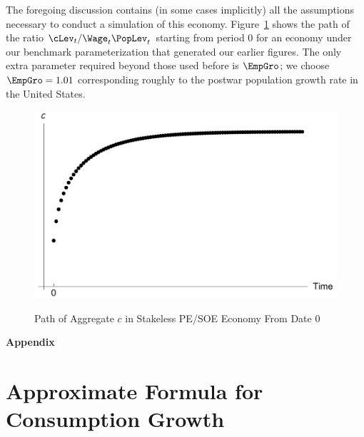 \documentclass{handout}
\begin{document}
The foregoing discussion contains (in some cases implicitly) all the
assumptions necessary to conduct a simulation of this economy.
Figure~\ref{fig:SOENoStakescPath} shows the path of the ratio $\cLev_{t}/\Wage_{t}\PopLev_{t}$ starting from
period 0 for an economy under our benchmark parameterization that generated
our earlier figures.  The
only extra parameter required beyond those used before is $\EmpGro$; we choose $\EmpGro=1.01$ corresponding
roughly to the postwar population growth rate in the United States.

\begin{figure}
\caption{Path of Aggregate $c$ in Stakeless PE/SOE Economy From Date 0}
\includegraphics[width=6in]{../Figures/SOENoStakescPath}
\label{fig:SOENoStakescPath}
\end{figure}



\label{sec:PFwhenFHWfails}
\pagebreak\appendix
\centerline{\bf \LARGE Appendix}\medskip

\setcounter{section}{0}

\section{Approximate Formula for Consumption Growth}\label{sec:CGroApprox}
\end{document}
